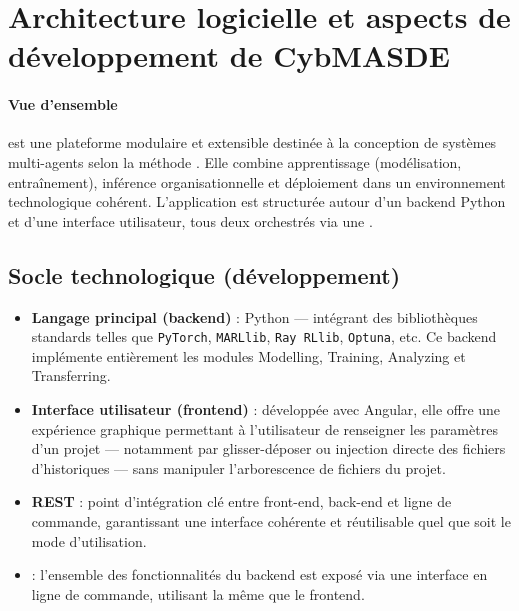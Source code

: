 \section*{Architecture logicielle et aspects de développement de CybMASDE}

\paragraph{Vue d'ensemble}
\footnotemark[1] est une plateforme modulaire et extensible destinée à la conception de systèmes multi-agents selon la méthode . Elle combine apprentissage (modélisation, entraînement), inférence organisationnelle et déploiement dans un environnement technologique cohérent. L'application est structurée autour d'un backend Python et d'une interface utilisateur, tous deux orchestrés via une  .



\subsection*{Socle technologique (développement)}

\begin{itemize}
  \item \textbf{Langage principal (backend)} : Python — intégrant des bibliothèques standards telles que \texttt{PyTorch}, \texttt{MARLlib}, \texttt{Ray RLlib}, \texttt{Optuna}, etc. Ce backend implémente entièrement les modules Modelling, Training, Analyzing et Transferring.
  \item \textbf{Interface utilisateur (frontend)} : développée avec Angular, elle offre une expérience graphique permettant à l'utilisateur de renseigner les paramètres d'un projet — notamment par glisser-déposer ou injection directe des fichiers d'historiques — sans manipuler l'arborescence de fichiers du projet.
  \item \textbf{ REST} : point d'intégration clé entre front-end, back-end et ligne de commande, garantissant une interface cohérente et réutilisable quel que soit le mode d'utilisation.
  \item \textbf{} : l'ensemble des fonctionnalités du backend est exposé via une interface en ligne de commande, utilisant la même   que le frontend.
\end{itemize}

